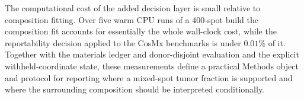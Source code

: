 The computational cost of the added decision layer is small relative to composition fitting. Over five warm CPU runs of a 400-spot build the composition fit accounts for essentially the whole wall-clock cost, while the reportability decision applied to the CosMx benchmarks is under \(0.01\%\) of it. Together with the materials ledger and donor-disjoint evaluation and the explicit withheld-coordinate state, these measurements define a practical Methods object and protocol for reporting where a mixed-spot tumor fraction is supported and where the surrounding composition should be interpreted conditionally.
